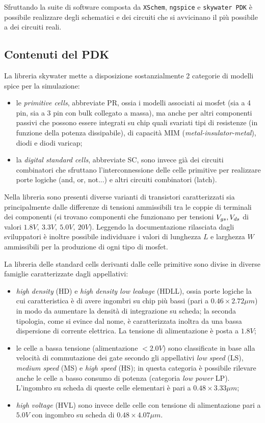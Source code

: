 	
	Sfruttando la suite di software composta da \texttt{XSchem}, \texttt{ngspice} e \texttt{skywater PDK} è possibile realizzare degli schematici e dei circuiti che si avvicinano il più possibile a dei circuiti reali.
	
	\subsection*{Contenuti del PDK}
		La libreria skywater mette a disposizione sostanzialmente 2 categorie di modelli spice per la simulazione:
		\begin{itemize}
			\item le \textit{primitive cells}, abbreviate PR, ossia i modelli associati ai mosfet (sia a 4 pin, sia a 3 pin con bulk collegato a massa), ma anche per altri componenti passivi che possono essere integrati su chip quali svariati tipi di resistenze (in funzione della potenza dissipabile), di capacità MIM (\textit{metal-insulator-metal}), diodi e diodi varicap;
			
			\item la \textit{digital standard cells}, abbreviate SC, sono invece già dei circuiti combinatori che sfruttano l'interconnessione delle celle primitive per realizzare porte logiche (and, or, not...) e altri circuiti combinatori (latch).
		\end{itemize}
		
		Nella libreria sono presenti diverse varianti di transistori caratterizzati sia principalmente dalle differenze di tensioni ammissibili tra le coppie di terminali dei componenti (si trovano componenti che funzionano per tensioni $V_{gs},V_{ds}$ di valori $1.8V,\ 3.3V,\ 5.0V, \ 20V$).  Leggendo la documentazione \cite{specsky} rilasciata dagli sviluppatori è inoltre possibile individuare i valori di lunghezza $L$ e larghezza $W$ ammissibili per la produzione di ogni tipo di mosfet.	
		
		La libreria delle standard cells derivanti dalle celle primitive sono divise in diverse famiglie caratterizzate dagli appellativi:
		\begin{itemize}
			\item \textit{high density} (HD) e \textit{high density low leakage} (HDLL), ossia porte logiche la cui caratteristica è di avere ingombri su chip più bassi (pari a $0.46\times 2.72 \mu m$) in modo da aumentare la densità di integrazione su scheda; la seconda tipologia, come si evince dal nome, è caratterizzata inoltra da una bassa dispersione di corrente elettrica. La tensione di alimentazione è posta a $1.8V$;
			\item le celle a bassa tensione (alimentazione $<2.0V$) sono classificate in base alla velocità di commutazione dei gate secondo gli appellativi \textit{low speed} (LS), \textit{medium speed} (MS) e \textit{high speed} (HS); in questa categoria è possibile rilevare anche le celle a basso consumo di potenza (categoria \textit{low power} LP). L'ingombro su scheda di queste celle elementari è pari a $0.48\times 3.33\mu m$;
			\item \textit{high voltage} (HVL) sono invece delle celle con tensione di alimentazione pari a $5.0V$ con ingombro su scheda di $0.48\times 4.07 \mu m$.
		\end{itemize}
	
